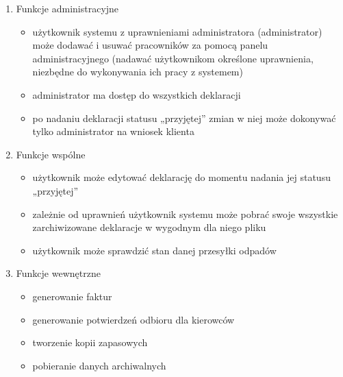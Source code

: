 
\begin{enumerate}
\item Funkcje administracyjne
	\begin{itemize}
		\item użytkownik systemu z uprawnieniami administratora (administrator) może dodawać i usuwać pracowników za pomocą panelu administracyjnego (nadawać użytkownikom określone uprawnienia, niezbędne do wykonywania ich pracy z systemem)
		\item administrator ma dostęp do wszystkich deklaracji
		\item po nadaniu deklaracji statusu „przyjętej” zmian w niej może dokonywać tylko administrator na wniosek klienta
	\end{itemize}

\item Funkcje wspólne
	\begin{itemize}
		\item użytkownik może edytować deklarację do momentu nadania jej statusu „przyjętej”
		\item zależnie od uprawnień użytkownik systemu może pobrać swoje wszystkie zarchiwizowane deklaracje w wygodnym dla niego pliku
		\item użytkownik może sprawdzić stan danej przesyłki odpadów
	\end{itemize}

\item Funkcje wewnętrzne
	\begin{itemize}
		\item generowanie faktur
		\item generowanie potwierdzeń odbioru dla kierowców
		\item tworzenie kopii zapasowych
		\item pobieranie danych archiwalnych
	\end{itemize}

\end{enumerate}